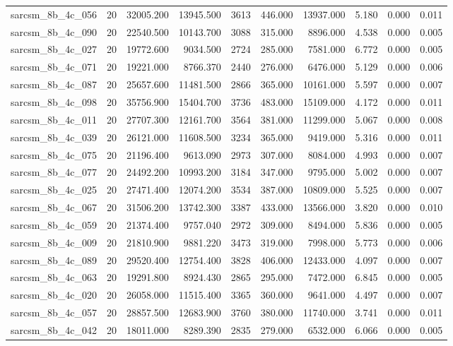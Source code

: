 \begin{tabular}{lrrrrrrrrr}
sarcsm\_8b\_4c\_056 & 20 & 32005.200 & 13945.500 & 3613 & 446.000 & 13937.000 & 5.180 & 0.000 & 0.011 \\
sarcsm\_8b\_4c\_090 & 20 & 22540.500 & 10143.700 & 3088 & 315.000 & 8896.000 & 4.538 & 0.000 & 0.005 \\
sarcsm\_8b\_4c\_027 & 20 & 19772.600 & 9034.500 & 2724 & 285.000 & 7581.000 & 6.772 & 0.000 & 0.005 \\
sarcsm\_8b\_4c\_071 & 20 & 19221.000 & 8766.370 & 2440 & 276.000 & 6476.000 & 5.129 & 0.000 & 0.006 \\
sarcsm\_8b\_4c\_087 & 20 & 25657.600 & 11481.500 & 2866 & 365.000 & 10161.000 & 5.597 & 0.000 & 0.007 \\
sarcsm\_8b\_4c\_098 & 20 & 35756.900 & 15404.700 & 3736 & 483.000 & 15109.000 & 4.172 & 0.000 & 0.011 \\
sarcsm\_8b\_4c\_011 & 20 & 27707.300 & 12161.700 & 3564 & 381.000 & 11299.000 & 5.067 & 0.000 & 0.008 \\
sarcsm\_8b\_4c\_039 & 20 & 26121.000 & 11608.500 & 3234 & 365.000 & 9419.000 & 5.316 & 0.000 & 0.011 \\
sarcsm\_8b\_4c\_075 & 20 & 21196.400 & 9613.090 & 2973 & 307.000 & 8084.000 & 4.993 & 0.000 & 0.007 \\
sarcsm\_8b\_4c\_077 & 20 & 24492.200 & 10993.200 & 3184 & 347.000 & 9795.000 & 5.002 & 0.000 & 0.007 \\
sarcsm\_8b\_4c\_025 & 20 & 27471.400 & 12074.200 & 3534 & 387.000 & 10809.000 & 5.525 & 0.000 & 0.007 \\
sarcsm\_8b\_4c\_067 & 20 & 31506.200 & 13742.300 & 3387 & 433.000 & 13566.000 & 3.820 & 0.000 & 0.010 \\
sarcsm\_8b\_4c\_059 & 20 & 21374.400 & 9757.040 & 2972 & 309.000 & 8494.000 & 5.836 & 0.000 & 0.005 \\
sarcsm\_8b\_4c\_009 & 20 & 21810.900 & 9881.220 & 3473 & 319.000 & 7998.000 & 5.773 & 0.000 & 0.006 \\
sarcsm\_8b\_4c\_089 & 20 & 29520.400 & 12754.400 & 3828 & 406.000 & 12433.000 & 4.097 & 0.000 & 0.007 \\
sarcsm\_8b\_4c\_063 & 20 & 19291.800 & 8924.430 & 2865 & 295.000 & 7472.000 & 6.845 & 0.000 & 0.005 \\
sarcsm\_8b\_4c\_020 & 20 & 26058.000 & 11515.400 & 3365 & 360.000 & 9641.000 & 4.497 & 0.000 & 0.007 \\
sarcsm\_8b\_4c\_057 & 20 & 28857.500 & 12683.900 & 3760 & 380.000 & 11740.000 & 3.741 & 0.000 & 0.011 \\
sarcsm\_8b\_4c\_042 & 20 & 18011.000 & 8289.390 & 2835 & 279.000 & 6532.000 & 6.066 & 0.000 & 0.005 \\

\end{tabular}
